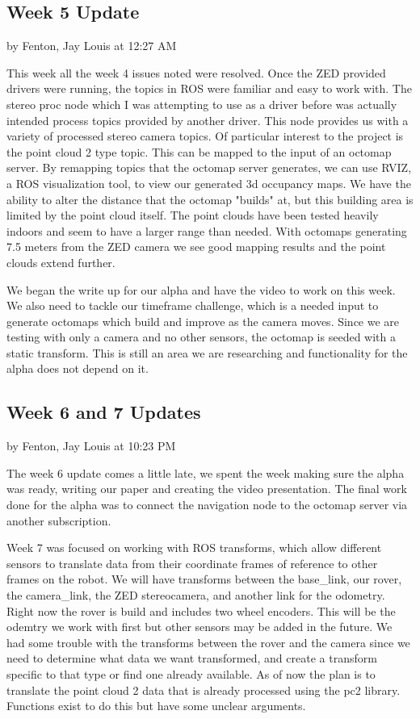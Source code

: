 \documentclass[10pt, oneside,onecolumn]{IEEEtran}
\begin{document}
\subsection{Week 5 Update}
by Fenton, Jay Louis at 12:27 AM

This week all the week 4 issues noted were resolved. Once the ZED provided drivers were running, the topics in ROS were familiar and easy to work with. The stereo proc node which I was attempting to use as a driver before was actually intended process topics provided by another driver. This node provides us with a variety of processed stereo camera topics. Of particular interest to the project is the point cloud 2 type topic. This can be mapped to the input of an octomap server. By remapping topics that the octomap server generates, we can use RVIZ, a ROS visualization tool, to view our generated 3d occupancy maps. We have the ability to alter the distance that the octomap "builds" at, but this building area is limited by the point cloud itself. The point clouds have been tested heavily indoors and seem to have a larger range than needed. With octomaps generating 7.5 meters from the ZED camera we see good mapping results and the point clouds extend further. 

We began the write up for our alpha and have the video to work on this week. We also need to tackle our timeframe challenge, which is a needed input to generate octomaps which build and improve as the camera moves. Since we are testing with only a camera and no other sensors, the octomap is seeded with a static transform. This is still an area we are researching and functionality for the alpha does not depend on it. 

\subsection{Week 6 and 7 Updates}
by Fenton, Jay Louis at 10:23 PM

The week 6 update comes a little late, we spent the week making sure the alpha was ready, writing our paper and creating the video presentation. The final work done for the alpha was to connect the navigation node to the octomap server via another subscription. 

Week 7 was focused on working with ROS transforms, which allow different sensors to translate data from their coordinate frames of reference to other frames on the robot. We will have transforms between the base\_link, our rover, the camera\_link, the ZED stereocamera, and another link for the odometry. Right now the rover is build and includes two wheel encoders. This will be the odemtry we work with first but other sensors may be added in the future. We had some trouble with the transforms between the rover and the camera since we need to determine what data we want transformed, and create a transform specific to that type or find one already available. As of now the plan is to translate the point cloud 2 data that is already processed using the pc2 library. Functions exist to do this but have some unclear arguments. 
\end{document}
